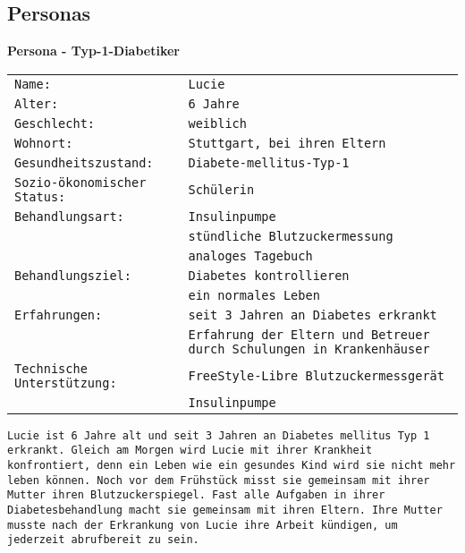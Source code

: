 	\subsection{Personas}
	\textbf{Persona - Typ-1-Diabetiker}
	\begin{center}
		\begin{longtable}[H]{p{6.6cm}p{6.6cm}}
			\addtocounter{table}{-1}
			\texttt{Name: }& \texttt{Lucie}\\
			\texttt{Alter: }& \texttt{6 Jahre}\\
			\texttt{Geschlecht: }&\texttt{weiblich}\\
			\texttt{Wohnort:} & \texttt{Stuttgart, bei ihren Eltern}\\
			\texttt{Gesundheitszustand:} & \texttt{Diabete-mellitus-Typ-1}\\
			\texttt{Sozio-ökonomischer Status: }& \texttt{Schülerin}\\
			\texttt{Behandlungsart:} & \texttt{Insulinpumpe}\\
			&  \texttt{stündliche Blutzuckermessung}\\
			&  \texttt{analoges Tagebuch}\\
			\texttt{Behandlungsziel:} &  \texttt{Diabetes kontrollieren}\\
			&  \texttt{ein normales Leben}\\
			\texttt{Erfahrungen: }&  \texttt{seit 3 Jahren an Diabetes erkrankt}\\
			&  \texttt{Erfahrung der Eltern und Betreuer durch Schulungen in Krankenhäuser}\\
			\texttt{Technische Unterstützung:} & \texttt{FreeStyle-Libre Blutzuckermessgerät}\\
			&  \texttt{Insulinpumpe}\\
		\end{longtable}
	\end{center}
	\texttt{Lucie ist 6 Jahre alt und seit 3 Jahren an Diabetes mellitus Typ 1 \newline
		erkrankt. Gleich am Morgen wird Lucie mit ihrer Krankheit konfrontiert, \newline 
		denn ein Leben wie ein gesundes Kind wird sie nicht mehr leben können. \newline
		Noch vor dem Frühstück misst sie gemeinsam mit ihrer Mutter ihren \newline
		Blutzuckerspiegel. Fast alle  Aufgaben in ihrer Diabetesbehandlung macht \newline 
		sie gemeinsam mit ihren Eltern. Ihre Mutter musste nach der Erkrankung \newline
		von Lucie ihre Arbeit kündigen, um jederzeit abrufbereit zu sein.}\newline
